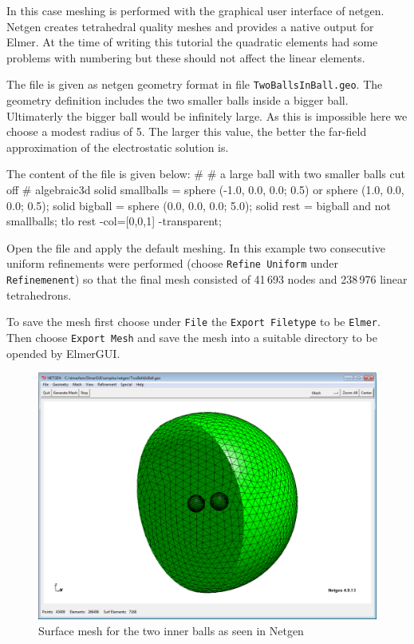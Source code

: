 In this case meshing is performed with the graphical user interface of netgen. Netgen creates tetrahedral quality meshes
and provides a native output for Elmer.
At the time of writing this tutorial the quadratic elements had some problems with numbering 
but these should not affect the linear elements.

The file is given as netgen geometry format in file \texttt{TwoBallsInBall.geo}. The geometry definition includes the 
two smaller balls inside a bigger ball. Ultimaterly the bigger ball would be infinitely large. As this is impossible 
here we choose a modest radius of 5. The larger this value, the better the far-field approximation of the 
electrostatic solution is.

The content of the file is given below:
\ttbegin
#
# a large ball with two smaller balls cut off
#
algebraic3d
solid smallballs = sphere (-1.0, 0.0, 0.0; 0.5)
           or sphere (1.0, 0.0, 0.0; 0.5);
solid bigball = sphere (0.0, 0.0, 0.0; 5.0);
solid rest = bigball and not smallballs;
tlo rest -col=[0,0,1] -transparent;
\ttend

Open the file and apply the default meshing. In this example two consecutive uniform refinements were performed 
(choose \texttt{Refine Uniform} under \texttt{Refinemenent}) so that the 
final mesh consisted of 41\,693 nodes and 238\,976 linear tetrahedrons. 

To save the mesh first choose under \texttt{File} the \texttt{Export Filetype} to be \texttt{Elmer}. Then choose
\texttt{Export Mesh} and save the mesh into a suitable directory to be opended
by ElmerGUI. 

\begin{figure}[h]
\centering
\includegraphics[width=140mm]{netgen_capture}
\caption{Surface mesh for the two inner balls as seen in Netgen}\label{fg:ballsnetgen}
\end{figure}  

